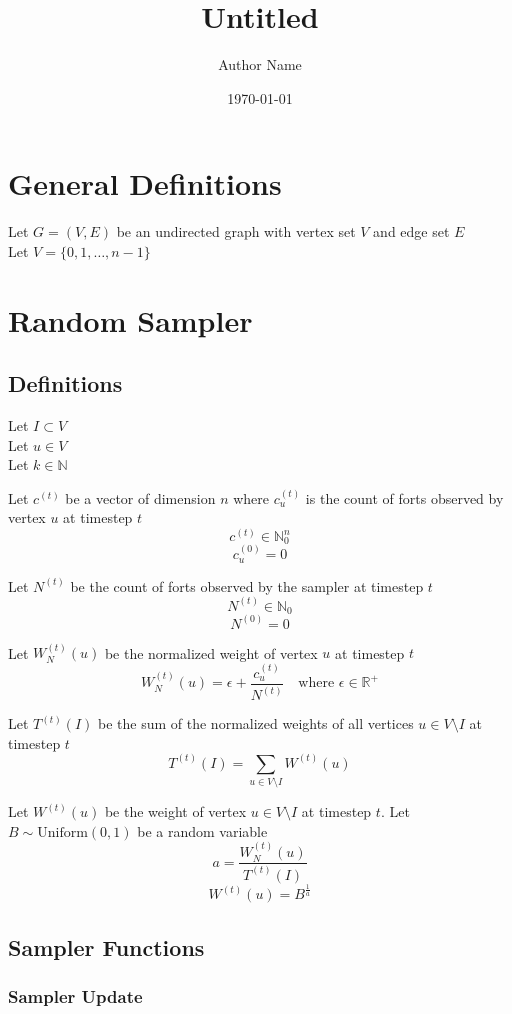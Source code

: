 \documentclass[11pt]{article}
\title{Untitled}
\author{Author Name}
\date{\today}
\begin{document}
\maketitle

\section{General Definitions}

Let $G=(V,E)$ be an undirected graph with vertex set $V$ and edge set $E$ \\
Let $V=\{0, 1, \dots, n-1\}$

\section{Random Sampler}

\subsection{Definitions}

Let $I \subset V$ \\
Let $u \in V$ \\
Let $k \in \mathbb{N}$

Let $c^{(t)}$ be a vector of dimension $n$ where $c_u^{(t)}$ is the count of forts observed by vertex $u$ at timestep $t$
$$c^{(t)} \in \mathbb{N}_0^n$$
$$c_u^{(0)} = 0$$

Let $N^{(t)}$ be the count of forts observed by the sampler at timestep $t$
$$N^{(t)} \in \mathbb{N}_0$$
$$N^{(0)} = 0$$

Let $W_N^{(t)}(u)$ be the normalized weight of vertex $u$ at timestep $t$
$$W_N^{(t)}(u) = \epsilon + \frac{c_u^{(t)}}{N^{(t)}} \quad \text{where } \epsilon \in \mathbb{R}^+$$

Let $T^{(t)}(I)$ be the sum of the normalized weights of all vertices $u \in V \setminus I$ at timestep $t$
$$T^{(t)}(I) = \sum_{u \in V \setminus I}{W^{(t)}(u)}$$

Let $W^{(t)}(u)$ be the weight of vertex $u \in V \setminus I$ at timestep $t$. 
Let $B \sim \text{Uniform}(0, 1)$ be a random variable
$$a = \frac{W_N^{(t)}(u)}{T^{(t)}(I)}$$
$$W^{(t)}(u) = B^{\frac{1}{a}}$$

\subsection{Sampler Functions}

\subsubsection{Sampler Update}
\end{document}
